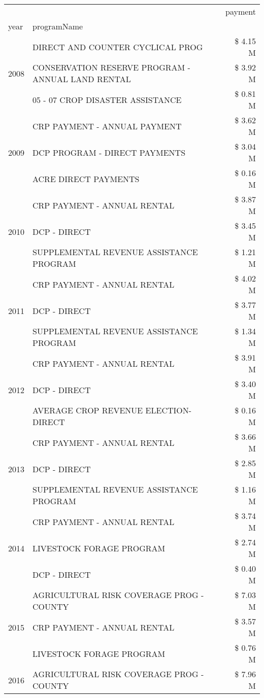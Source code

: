 \begin{tabular}{llr}
\toprule
 &  & payment \\
year & programName &  \\
\midrule
\multirow[t]{3}{*}{2008} & DIRECT AND COUNTER CYCLICAL PROG & \$ 4.15 M \\
 & CONSERVATION RESERVE PROGRAM - ANNUAL LAND RENTAL & \$ 3.92 M \\
 & 05 - 07 CROP DISASTER ASSISTANCE & \$ 0.81 M \\
\cline{1-3}
\multirow[t]{3}{*}{2009} & CRP PAYMENT - ANNUAL PAYMENT & \$ 3.62 M \\
 & DCP PROGRAM - DIRECT PAYMENTS & \$ 3.04 M \\
 & ACRE DIRECT PAYMENTS & \$ 0.16 M \\
\cline{1-3}
\multirow[t]{3}{*}{2010} & CRP PAYMENT - ANNUAL RENTAL & \$ 3.87 M \\
 & DCP - DIRECT & \$ 3.45 M \\
 & SUPPLEMENTAL REVENUE ASSISTANCE PROGRAM & \$ 1.21 M \\
\cline{1-3}
\multirow[t]{3}{*}{2011} & CRP PAYMENT - ANNUAL RENTAL & \$ 4.02 M \\
 & DCP - DIRECT & \$ 3.77 M \\
 & SUPPLEMENTAL REVENUE ASSISTANCE PROGRAM & \$ 1.34 M \\
\cline{1-3}
\multirow[t]{3}{*}{2012} & CRP PAYMENT - ANNUAL RENTAL & \$ 3.91 M \\
 & DCP - DIRECT & \$ 3.40 M \\
 & AVERAGE CROP REVENUE ELECTION-DIRECT & \$ 0.16 M \\
\cline{1-3}
\multirow[t]{3}{*}{2013} & CRP PAYMENT - ANNUAL RENTAL & \$ 3.66 M \\
 & DCP - DIRECT & \$ 2.85 M \\
 & SUPPLEMENTAL REVENUE ASSISTANCE PROGRAM & \$ 1.16 M \\
\cline{1-3}
\multirow[t]{3}{*}{2014} & CRP PAYMENT - ANNUAL RENTAL & \$ 3.74 M \\
 & LIVESTOCK FORAGE PROGRAM & \$ 2.74 M \\
 & DCP - DIRECT & \$ 0.40 M \\
\cline{1-3}
\multirow[t]{3}{*}{2015} & AGRICULTURAL RISK COVERAGE PROG - COUNTY & \$ 7.03 M \\
 & CRP PAYMENT - ANNUAL RENTAL & \$ 3.57 M \\
 & LIVESTOCK FORAGE PROGRAM & \$ 0.76 M \\
\cline{1-3}
\multirow[t]{3}{*}{2016} & AGRICULTURAL RISK COVERAGE PROG - COUNTY & \$ 7.96 M \\

\end{tabular}
